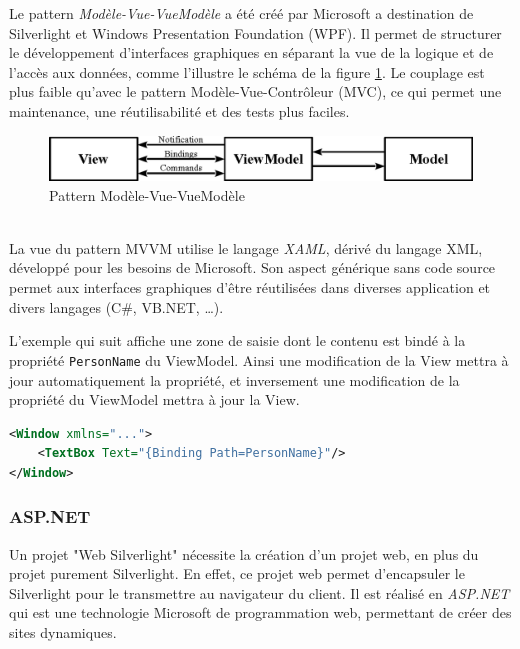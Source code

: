 
Le pattern \textit{Modèle-Vue-VueModèle} a été créé par Microsoft a destination de Silverlight et Windows Presentation Foundation (WPF).
Il permet de structurer le développement d'interfaces graphiques en séparant la vue de la logique et de l'accès aux données, comme l'illustre le schéma de la figure \ref{MVVM}.
Le couplage est plus faible qu'avec le pattern Modèle-Vue-Contrôleur (MVC), ce qui permet une maintenance, une réutilisabilité et des tests plus faciles.
\begin{figure}[!h]
	\center
	\includegraphics[width=1\textwidth]{img/MVVM.png}
	\caption{Pattern Modèle-Vue-VueModèle}
	\label{MVVM}
\end{figure}
~~\\

La vue du pattern MVVM utilise le langage \textit{XAML}, dérivé du langage XML, développé pour les besoins de Microsoft.
Son aspect générique sans code source permet aux interfaces graphiques d'être réutilisées dans diverses application et divers langages (C\#, VB.NET, \ldots).

L'exemple qui suit affiche une zone de saisie dont le contenu est bindé à la propriété \lstinline{PersonName} du ViewModel.
Ainsi une modification de la View mettra à jour automatiquement la propriété, et inversement une modification de la propriété du ViewModel mettra à jour la View.
\begin{lstlisting}[language = xml]
<Window xmlns="...">
	<TextBox Text="{Binding Path=PersonName}"/>
</Window>
\end{lstlisting}


\subsubsection{ASP.NET}

Un projet "Web Silverlight" nécessite la création d'un projet web, en plus du projet purement Silverlight.
En effet, ce projet web permet d'encapsuler le Silverlight pour le transmettre au navigateur du client.
Il est réalisé en \textit{ASP.NET} qui est une technologie Microsoft de programmation web, permettant de créer des sites dynamiques.

